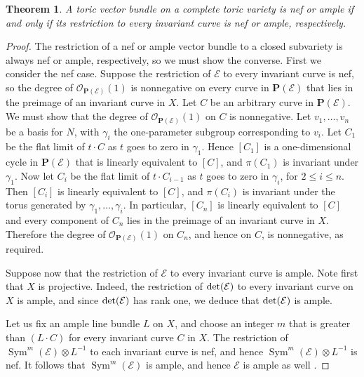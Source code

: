 \documentclass[12pt]{amsart}
\newtheorem{theorem}[lemma]{Theorem}
\theoremstyle{definition}
\theoremstyle{remark}
\begin{document}
\begin{theorem}\label{char_nef}
A toric vector bundle on a complete toric variety is nef
or ample if and only if its restriction to every invariant curve is nef or ample,
respectively.
\end{theorem}

\begin{proof}
The restriction of a nef or ample vector bundle to a closed
subvariety is always nef or ample, respectively, so we must show the
converse.  First we consider the nef case. Suppose the restriction
of ${\mathcal{E}}$ to every invariant curve is nef, so the degree of
${\mathcal{O}}_{{{\mathbf P}}({\mathcal{E}})}(1)$ is nonnegative on every curve in ${{\mathbf P}}({\mathcal{E}})$ that
lies in the preimage of an invariant curve in $X$. Let $C$ be an
arbitrary curve in ${{\mathbf P}}({\mathcal{E}})$. We must show that the degree of
${\mathcal{O}}_{{{\mathbf P}}({\mathcal{E}})}(1)$ on $C$ is nonnegative.  Let $v_1, \ldots, v_n$
be a basis for $N$, with $\gamma_i$ the one-parameter subgroup
corresponding to $v_i$.  Let $C_1$ be the flat limit of $t \cdot C$
as $t$ goes to zero in $\gamma_1$.  Hence $[C_1]$ is a one-dimensional
cycle in ${{\mathbf P}}({\mathcal{E}})$ that is linearly equivalent to $[C]$, and
$\pi(C_1)$ is invariant under $\gamma_1$.  Now let $C_i$ be the flat
limit of $t\cdot C_{i-1}$ as $t$ goes to zero in $\gamma_i$, for $2
\leq i \leq n$.  Then $[C_i]$ is linearly equivalent to $[C]$, and
$\pi(C_i)$ is invariant under the torus generated by $\gamma_1,
\ldots, \gamma_i$.  In particular, $[C_n]$ is linearly equivalent to
$[C]$ and every component of $C_n$ lies in the preimage of an
invariant curve in $X$.  Therefore the degree of ${\mathcal{O}}_{{{\mathbf P}}({\mathcal{E}})}(1)$
on $C_n$, and hence on $C$, is nonnegative, as required.

Suppose now that the restriction of ${\mathcal{E}}$ to every invariant curve is
ample. Note first that $X$ is projective. Indeed, the restriction of ${\rm det}({\mathcal{E}})$
to every invariant curve on $X$ is ample, and since ${\rm det}({\mathcal{E}})$ has rank one,
we deduce that ${\rm det}({\mathcal{E}})$ is ample.

Let us fix  an ample line bundle $L$ 
on $X$, and choose an
integer $m$ that is greater than $(L \cdot C)$ for every invariant
curve $C$ in $X$.  The restriction of $\operatorname{Sym}^m({\mathcal{E}}) \otimes L^{-1}$
to each invariant curve is nef, and hence $\operatorname{Sym}^m({\mathcal{E}}) \otimes
L^{-1}$ is nef.  It follows that $\operatorname{Sym}^m({\mathcal{E}})$ is ample, and hence
${\mathcal{E}}$ is ample as well \cite[Proposition~6.2.11 and
Theorem~6.1.15]{positivity}.
\end{proof}
\end{document}
